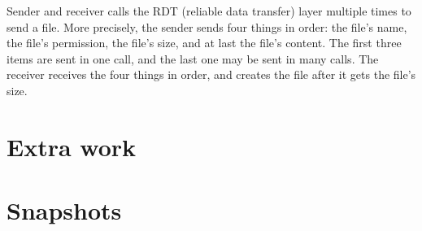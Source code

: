 \documentclass[10pt,a4paper]{article}
\begin{document}
    Sender and receiver calls the RDT (reliable data transfer) layer multiple times to send a file. More precisely, the sender sends four things in order: the file's name, the file's permission, the file's size, and at last the file's content. The first three items are sent in one call, and the last one may be sent in many calls. The receiver receives the four things in order, and creates the file after it gets the file's size.

\section{Extra work}
\section{Snapshots}
\end{document}
